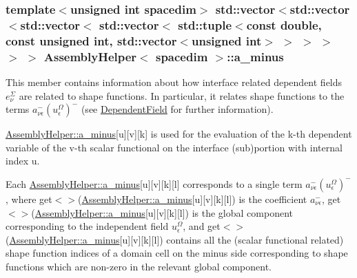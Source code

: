 \subsubsection[{\texorpdfstring{a\+\_\+minus}{a_minus}}]{\setlength{\rightskip}{0pt plus 5cm}template$<$unsigned int spacedim$>$ std\+::vector$<$std\+::vector$<$std\+::vector$<$ std\+::vector$<$ std\+::tuple$<$const double, const unsigned int, std\+::vector$<$unsigned int$>$ $>$ $>$ $>$ $>$ $>$ {\bf Assembly\+Helper}$<$ spacedim $>$\+::a\+\_\+minus\hspace{0.3cm}{\ttfamily [private]}}\hypertarget{class_assembly_helper_a4461be378c9be0364ca23153c367d24c}{}\label{class_assembly_helper_a4461be378c9be0364ca23153c367d24c}
This member contains information about how interface related dependent fields $e^\Sigma_\nu$ are related to shape functions. In particular, it relates shape functions to the terms $a^-_{\nu\epsilon} (u^\Omega_\epsilon)^-$ (see \hyperlink{class_dependent_field}{Dependent\+Field} for further information).

\hyperlink{class_assembly_helper_a4461be378c9be0364ca23153c367d24c}{Assembly\+Helper\+::a\+\_\+minus}\mbox{[}{\ttfamily u}\mbox{]}\mbox{[}{\ttfamily v}\mbox{]}\mbox{[}{\ttfamily k}\mbox{]} is used for the evaluation of the {\ttfamily k-\/th} dependent variable of the {\ttfamily v-\/th} scalar functional on the interface (sub)portion with internal index {\ttfamily u}.

Each \hyperlink{class_assembly_helper_a4461be378c9be0364ca23153c367d24c}{Assembly\+Helper\+::a\+\_\+minus}\mbox{[}{\ttfamily u}\mbox{]}\mbox{[}{\ttfamily v}\mbox{]}\mbox{[}{\ttfamily k}\mbox{]}\mbox{[}{\ttfamily l}\mbox{]} corresponds to a single term $a^-_{\nu\epsilon} (u^\Omega_\epsilon)^-$, where {\ttfamily get$<${$>$}(\hyperlink{class_assembly_helper_a4461be378c9be0364ca23153c367d24c}{Assembly\+Helper\+::a\+\_\+minus}}\mbox{[}{\ttfamily u}\mbox{]}\mbox{[}{\ttfamily v}\mbox{]}\mbox{[}{\ttfamily k}\mbox{]}\mbox{[}{\ttfamily l}\mbox{]}) is the coefficient $a^-_{\nu\epsilon}$, {\ttfamily get$<${$>$}(\hyperlink{class_assembly_helper_a4461be378c9be0364ca23153c367d24c}{Assembly\+Helper\+::a\+\_\+minus}}\mbox{[}{\ttfamily u}\mbox{]}\mbox{[}{\ttfamily v}\mbox{]}\mbox{[}{\ttfamily k}\mbox{]}\mbox{[}{\ttfamily l}\mbox{]}) is the global component corresponding to the independent field $u^\Omega_\epsilon$, and {\ttfamily get$<${$>$}(\hyperlink{class_assembly_helper_a4461be378c9be0364ca23153c367d24c}{Assembly\+Helper\+::a\+\_\+minus}}\mbox{[}{\ttfamily u}\mbox{]}\mbox{[}{\ttfamily v}\mbox{]}\mbox{[}{\ttfamily k}\mbox{]}\mbox{[}{\ttfamily l}\mbox{]}) contains all the (scalar functional related) shape function indices of a domain cell on the minus side corresponding to shape functions which are non-\/zero in the relevant global component. 
